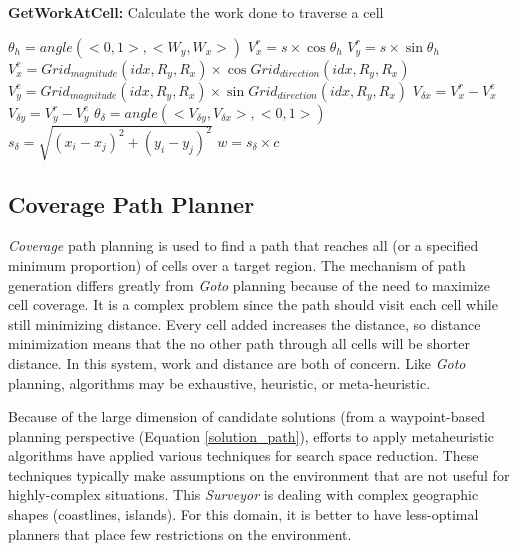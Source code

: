 \documentclass{tamuccthesis}
\begin{document}
\begin{spacing}{0.5}
\begin{algorithm}[H]
\caption[GetWorkAtCell]{\textbf{GetWorkAtCell:} Calculate the work done to traverse a cell} 
\label{alg:getworkatcell}
\SetAlgoVlined
{}
$\theta_h = angle(<0, 1>, <W_y, W_x>)$\;
$V^r_x = s \times \cos{\theta_h}$\;
$V^r_y = s \times \sin{\theta_h}$\;
$V^e_x = Grid_{magnitude}(idx, R_y, R_x) \times \cos{Grid_{direction}(idx, R_y, R_x)}$\;
$V^e_y = Grid_{magnitude}(idx, R_y, R_x) \times \sin{Grid_{direction}(idx, R_y, R_x)}$\;
$V_{\delta x} = V^r_x - V^e_x$\;
$V_{\delta y} = V^r_y - V^e_y$\;
$\theta_{\delta} = angle(<V_{\delta y}, V_{\delta x}>, <0, 1>)$\;
$s_{\delta} = \sqrt{(x_{i} - x_{j})^2 + (y_{i} - y_{j})^2}$\;
$w = s_{\delta} \times c$\;
\end{algorithm}
\end{spacing}


\subsection{Coverage Path Planner}

\textit{Coverage} path planning is used to find a path that reaches all (or a specified minimum proportion) of cells over a target region. The mechanism of path generation differs greatly from \textit{Goto} planning because of the need to maximize cell coverage. It is a complex problem since the path should visit each cell while still minimizing distance. Every cell added increases the distance, so distance minimization means that the no other path through all cells will be shorter distance. In this system, work and distance are both of concern. Like \textit{Goto} planning, algorithms may be exhaustive, heuristic, or meta-heuristic. 

Because of the large dimension of candidate solutions (from a waypoint-based planning perspective (Equation \ref{solution_path}), efforts to apply metaheuristic algorithms have applied various techniques for search space reduction. These techniques typically make assumptions on the environment that are not useful for highly-complex situations. This \textit{Surveyor} is dealing with complex geographic shapes (coastlines, islands). For this domain, it is better to have less-optimal planners that place few restrictions on the environment. 
\end{document}
